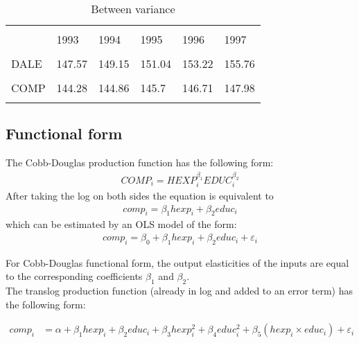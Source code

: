 \documentclass[12pt,a4paper]{article}\usepackage[]{graphicx}\usepackage[]{color}
\begin{document}
\begin{table}[htbp] \centering 
  \caption{Between variance} 
  \label{Between variance of DALE and COMP} 
  \normalsize
\begin{tabular}{p{5cm} p{1.2cm} p{1.2cm} p{1.2cm} p{1.2cm} p{1.2cm}} 
\\[-1.8ex]\hline 
\hline \\[-1.8ex] 
 & 1993 & 1994 & 1995 & 1996 & 1997 \\ 
\hline \\[-1.8ex] 
DALE & 147.57 & 149.15 & 151.04 & 153.22 & 155.76 \\
\hline \\[-1.8ex] 
COMP & 144.28 & 144.86 & 145.7 & 146.71 & 147.98 \\
\hline
\hline \\[-1.8ex] 
\end{tabular} 
\end{table}








\subsection{Functional form}
The Cobb-Douglas production function has the following form:
\begin{gather}
COMP_i = HEXP_i^{\beta_1}EDUC_i^{\beta_2}
\end{gather}
After taking the log on both sides the equation is equivalent to
\begin{gather}
comp_i = \beta_1 hexp_i + \beta_2 educ_i
\end{gather}
which can be estimated by an OLS model of the form:
\begin{gather}
comp_i = \beta_0 + \beta_1 hexp_i + \beta_2 educ_i + \varepsilon_i
\end{gather}

For Cobb-Douglas functional form, the output elasticities of the inputs are equal to the corresponding coefficients $\beta_1$ and $\beta_2$. \\

The translog production function (already in log and added to an error term) has the following form: 

\begin{equation}
\label{eq:translog.nocontrols}
\begin{aligned}
comp_i &= \alpha + \beta_1 hexp_i + \beta_2 educ_i + \beta_3 hexp_i^2 + \beta_4 educ_i^2 + \beta_5 \left(hexp_i \times educ_i\right) + \varepsilon_i
\end{aligned}
\end{equation}
\end{document}
